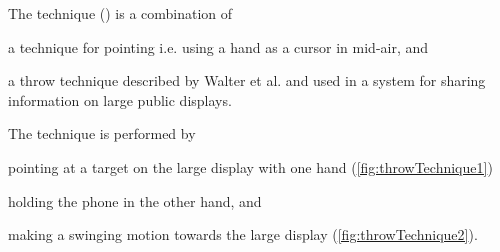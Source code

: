 The \throw technique () is a combination of  
\begin{enumerate*}[label=\itshape\alph*\upshape)]
	\item{a technique for pointing \cite{Scheible:2008} i.e. using a hand as a cursor in mid-air, and}
	\item{a throw technique described by Walter et al. \cite{Walter:2014} and used in a system for sharing information on large public displays.}
\end{enumerate*}
The \throw technique is performed by 
\begin{enumerate*}[label=\itshape\roman*\upshape)]
	\item{pointing at a target on the large display with one hand (\cref{fig:throwTechnique1})} 
	\item{holding the phone in the other hand, and}
	\item{making a swinging motion towards the large display (\cref{fig:throwTechnique2}).}
\end{enumerate*}

